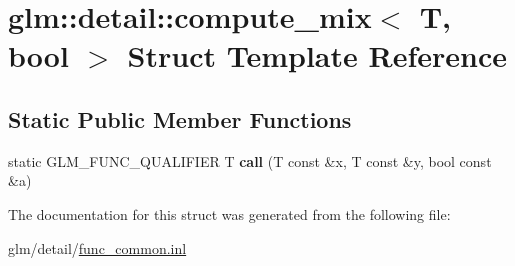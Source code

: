 \hypertarget{structglm_1_1detail_1_1compute__mix_3_01T_00_01bool_01_4}{\section{glm\-:\-:detail\-:\-:compute\-\_\-mix$<$ T, bool $>$ Struct Template Reference}
\label{structglm_1_1detail_1_1compute__mix_3_01T_00_01bool_01_4}
}
\subsection*{Static Public Member Functions}
\begin{DoxyCompactItemize}
\item 
\hypertarget{structglm_1_1detail_1_1compute__mix_3_01T_00_01bool_01_4_a7a83cf7bd102239b974faf18137d8c63}{static G\-L\-M\-\_\-\-F\-U\-N\-C\-\_\-\-Q\-U\-A\-L\-I\-F\-I\-E\-R T {\bfseries call} (T const \&x, T const \&y, bool const \&a)}\label{structglm_1_1detail_1_1compute__mix_3_01T_00_01bool_01_4_a7a83cf7bd102239b974faf18137d8c63}

\end{DoxyCompactItemize}


The documentation for this struct was generated from the following file\-:\begin{DoxyCompactItemize}
\item 
glm/detail/\hyperlink{func__common_8inl}{func\-\_\-common.\-inl}\end{DoxyCompactItemize}
